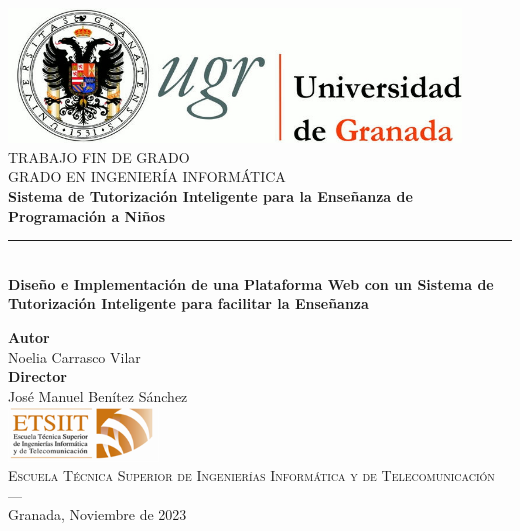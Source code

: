 \begin{titlepage}
 
 
\newlength{\centeroffset}
\setlength{\centeroffset}{-0.5\oddsidemargin}
\addtolength{\centeroffset}{0.5\evensidemargin}
\thispagestyle{empty}

\noindent\hspace*{\centeroffset}\begin{minipage}{\textwidth}

\centering
\includegraphics[width=0.9\textwidth]{imagenes/logo_ugr.jpg}\\[1.4cm]

\textsc{ \Large TRABAJO FIN DE GRADO\\[0.2cm]}
\textsc{GRADO EN INGENIERÍA INFORMÁTICA}\\[1cm]
% 
{\Huge\bfseries  Sistema de Tutorización Inteligente para la Enseñanza de Programación a Niños\\[0.2cm]}
\noindent\rule[-1ex]{\textwidth}{3pt}\\[3.5ex]
{\large\bfseries Diseño e Implementación de una Plataforma Web con un Sistema de Tutorización Inteligente para facilitar la Enseñanza}
\end{minipage}

\vspace{0.5cm}
\noindent\hspace*{\centeroffset}\begin{minipage}{\textwidth}
\centering

\textbf{Autor}\\ {Noelia Carrasco Vilar}\\[1cm]
\textbf{Director}\\ {José Manuel Benítez Sánchez}\\[1cm]
\includegraphics[width=0.3\textwidth]{imagenes/etsiit_logo.png}\\[0.5cm]
\textsc{Escuela Técnica Superior de Ingenierías Informática y de Telecomunicación}\\
\textsc{---}\\
Granada, Noviembre de 2023
\end{minipage}
\end{titlepage}

    
    